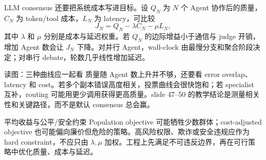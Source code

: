 LLM consensus 还要把系统成本写进目标。设 $Q_N$ 为 $N$ 个 Agent 协作后的质量，$C_N$ 为 token/tool 成本，$L_N$ 为 latency，可比较
\[
J_N=Q_N-\lambda C_N-\mu L_N,
\]
其中 $\lambda$ 和 $\mu$ 分别是成本与延迟权重。若 $Q_N$ 的边际增益小于通信与 judge 开销，增加 Agent 数会让 $J_N$ 下降。对并行 Agent，wall-clock 由最慢分支和聚合阶段决定；对串行 debate，轮数几乎线性增加延迟。

\begin{knowledgebox}{读图：三种曲线应一起看}
质量随 Agent 数上升并不够，还要看 error overlap、latency 和 cost。若多个副本错误高度相关，投票曲线会很快饱和；若 specialist 互补，routing 可能用更少调用获得更高质量。slide 47--50 的教学结论是测量相关性和关键路径，而不是默认 consensus 总会赢。
\end{knowledgebox}

\begin{warningbox}{平均收益与公平/安全约束}
Population objective 可能牺牲少数群体；cost-adjusted objective 也可能偏向廉价但危险的策略。高风险权限、欺诈或安全违规应作为 hard constraint，不应只由 $\lambda,\mu$ 加权。工程上先满足不可违反边界，再在可行策略中优化质量、成本与延迟。
\end{warningbox}

